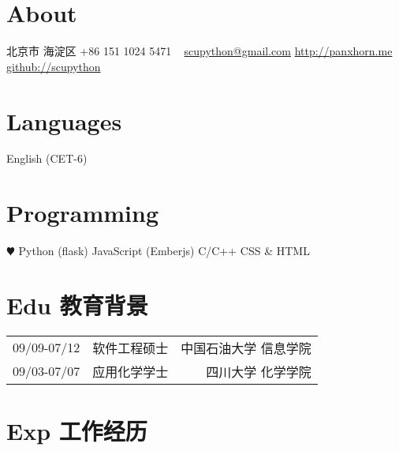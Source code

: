 \documentclass[]{friggeri-cv}
\begin{document}


\begin{aside}
  \section{About}
    北京市 海淀区
    +86 151 1024 5471
    ~
    \href{mailto:scupython@gmail.com}{scupython@gmail.com}
    \href{http://panxhorn.me}{http://panxhorn.me}
    \href{https://github.com/scupython/}{github://scupython}
  \section{Languages}
    English (CET-6)
  \section{Programming}
    {\color{red} $\varheartsuit$} Python (flask)
    JavaScript (Emberjs)
    C/C++ 
    CSS \& HTML
\end{aside}

\section{Edu 教育背景}
{\small
\begin{tabularx}{\textwidth}{lRR}
  09/09-07/12&软件工程硕士&中国石油大学 信息学院 \\
  09/03-07/07&应用化学学士&四川大学 化学学院
\end{tabularx}
}
\section{Exp 工作经历}
\end{document}
